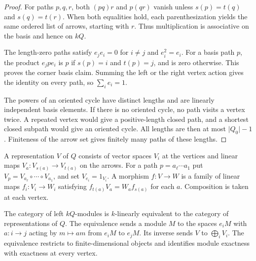 \begin{proof}
For paths \(p,q,r\), both \((pq)r\) and \(p(qr)\) vanish unless
\(s(p)=t(q)\) and \(s(q)=t(r)\). When both equalities hold, each
parenthesization yields the same ordered list of arrows, starting
with \(r\). Thus multiplication is associative on the basis and
hence on \(kQ\).

The length-zero paths satisfy \(e_j e_i=0\) for \(i\ne j\) and
\(e_i^2=e_i\). For a basis path \(p\), the product
\(e_j p e_i\) is \(p\) if \(s(p)=i\) and \(t(p)=j\), and is zero
otherwise. This proves the corner basis claim. Summing the left or
the right vertex action gives the identity on every path, so
\(\sum_i e_i=1\).

The powers of an oriented cycle have distinct lengths and are
linearly independent basis elements. If there is no oriented cycle,
no path visits a vertex twice. A repeated vertex would give a
positive-length closed path, and a shortest closed subpath would
give an oriented cycle. All lengths are then at most
\(\lvert Q_0\rvert-1\). Finiteness of the arrow set gives finitely
many paths of these lengths.
\end{proof}

\begin{definition}
\label{def:rm03-quiver-representations}
A representation \(V\) of \(Q\) consists of vector spaces \(V_i\)
at the vertices and linear maps \(V_a\colon V_{s(a)}\to V_{t(a)}\)
on the arrows. For a path \(p=a_\ell\cdots a_1\) put
\(V_p=V_{a_\ell}\circ\cdots\circ V_{a_1}\), and set
\(V_{e_i}=1_{V_i}\). A morphism \(f\colon V\to W\) is a family of
linear maps \(f_i\colon V_i\to W_i\) satisfying
\(f_{t(a)}V_a=W_a f_{s(a)}\) for each \(a\). Composition is taken
at each vertex.
\end{definition}

\begin{theorem}
\label{thm:rm03-quiver-equivalence}
The category of left \(kQ\)-modules is \(k\)-linearly equivalent to
the category of representations of \(Q\). The equivalence sends a
module \(M\) to the spaces \(e_iM\) with \(a\colon i\to j\) acting
by \(m\mapsto am\) from \(e_iM\) to \(e_jM\). Its inverse sends
\(V\) to \(\bigoplus_i V_i\). The equivalence restricts to
finite-dimensional objects and identifies module exactness with
exactness at every vertex.
\end{theorem}

